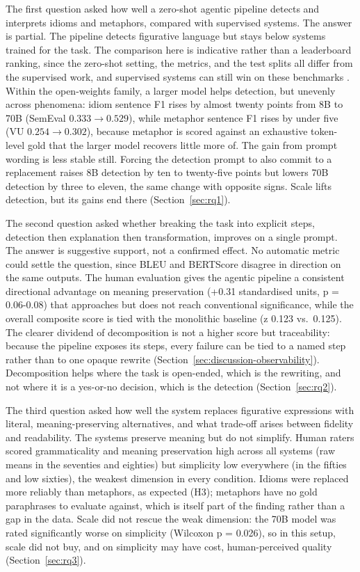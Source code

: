 The first question asked how well a zero-shot agentic pipeline detects and
interprets idioms and metaphors, compared with supervised systems. The answer
is partial. The pipeline detects figurative language but stays below systems
trained for the task. The comparison here is indicative rather than a
leaderboard ranking, since the zero-shot setting, the metrics, and the test
splits all differ from the supervised work, and supervised systems can still win
on these benchmarks \cite{Jia2024}. Within the open-weights family, a larger
model helps detection, but unevenly across phenomena: idiom sentence F1 rises by
almost twenty points from 8B to 70B (SemEval $0.333 \rightarrow 0.529$), while
metaphor sentence F1 rises by under five (VU $0.254 \rightarrow 0.302$), because
metaphor is scored against an exhaustive token-level gold that the larger model
recovers little more of. The gain from prompt wording is less stable still.
Forcing the detection prompt to also commit to a replacement raises 8B detection
by ten to twenty-five points but lowers 70B detection by three to eleven, the
same change with opposite signs. Scale lifts detection, but its gains end there
(Section~\ref{sec:rq1}).

The second question asked whether breaking the task into explicit steps,
detection then explanation then transformation, improves on a single prompt.
The answer is suggestive support, not a confirmed effect. No automatic metric
could settle the question, since BLEU and BERTScore disagree in direction on the
same outputs. The human evaluation gives the agentic pipeline a consistent
directional advantage on meaning preservation (+0.31 standardised units,
p = 0.06-0.08) that approaches but does not reach conventional significance,
while the overall composite score is tied with the monolithic baseline
(z 0.123 vs.\ 0.125). The clearer dividend of decomposition is not a higher
score but traceability: because the pipeline exposes its steps, every failure
can be tied to a named step rather than to one opaque rewrite
(Section~\ref{sec:discussion-observability}). Decomposition helps where the task
is open-ended, which is the rewriting, and not where it is a yes-or-no decision,
which is the detection (Section~\ref{sec:rq2}).

The third question asked how well the system replaces figurative expressions
with literal, meaning-preserving alternatives, and what trade-off arises between
fidelity and readability. The systems preserve meaning but do not simplify.
Human raters scored grammaticality and meaning preservation high across all
systems (raw means in the seventies and eighties) but simplicity low everywhere
(in the fifties and low sixties), the weakest dimension in every condition.
Idioms were replaced more reliably than metaphors, as expected (H3); metaphors
have no gold paraphrases to evaluate against, which is itself part of the
finding rather than a gap in the data. Scale did not rescue the weak dimension:
the 70B model was rated significantly worse on simplicity (Wilcoxon p = 0.026),
so in this setup, scale did not buy, and on simplicity may have cost,
human-perceived quality (Section~\ref{sec:rq3}).

